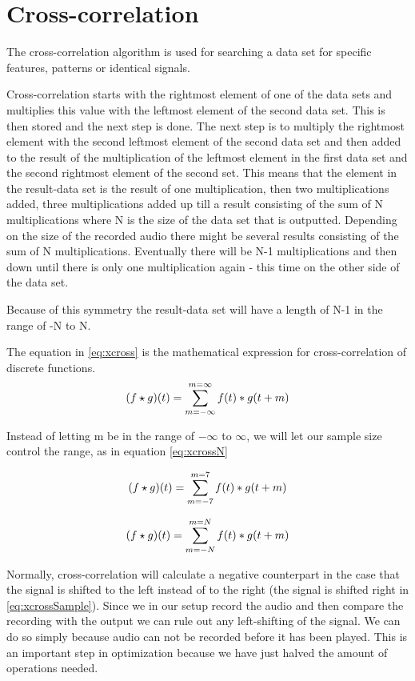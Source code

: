 \section{Cross-correlation}
The cross-correlation algorithm is used for searching a data set for specific features, patterns or identical signals.

Cross-correlation starts with the rightmost element of one of the data sets and multiplies this value with the leftmost  element of the second data set. This is then stored and the next step is done. The next step is to multiply the rightmost  element with the second leftmost element of the second data set and then added to the result of the multiplication of the  leftmost element in the first data set and the second rightmost element of the second set. This means that the element in the result-data set is the result of one multiplication, then two multiplications added, three multiplications added up till a result consisting of the sum of N multiplications where N is the size of the data set that is outputted. Depending on the size of the recorded audio there might be several results consisting of the sum of N multiplications. Eventually there will be N-1 multiplications and then down until there is only one multiplication again - this time on the other side of the data set.

Because of this symmetry the result-data set will have a length of N-1 in the range of -N to N.

The equation in \ref{eq:xcross} is the mathematical expression for cross-correlation of discrete functions.
\begin{equation}
\label{eq:xcross}
\centering
(f\star g)(t)=\sum\limits_{m=-\infty}^{m=\infty}f(t)*g(t+m)
\end{equation}

Instead of letting m be in the range of $-\infty$ to $\infty$, we will let our sample size control the range, as in equation \ref{eq:xcrossN}

\begin{equation}
\label{eq:xcross2}
\centering
(f\star g)(t)=\sum\limits_{m=-7}^{m=7}f(t)*g(t+m)
\end{equation}

\begin{equation}
\label{eq:xcrossN}
\centering
(f\star g)(t)=\sum\limits_{m=-N}^{m=N}f(t)*g(t+m)
\end{equation}

Normally, cross-correlation will calculate a negative counterpart in the case that the signal is shifted to the left instead of to the right (the signal is shifted right in \ref{eq:xcrossSample}). Since we in our setup record the audio and then compare the recording with the output we can rule out any left-shifting of the signal. We can do so simply because audio can not be recorded before it has been played. This is an important step in optimization because we have just halved the amount of operations needed.

